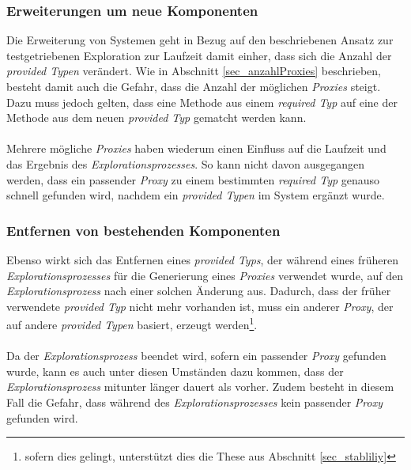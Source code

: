 \subsubsection{Erweiterungen um neue Komponenten}
Die Erweiterung von Systemen geht in Bezug auf den beschriebenen Ansatz zur testgetriebenen Exploration zur Laufzeit damit einher, dass sich die Anzahl der \emph{provided Typen} verändert. Wie in Abschnitt \ref{sec_anzahlProxies} beschrieben, besteht damit auch die Gefahr, dass die Anzahl der möglichen \emph{Proxies} steigt. Dazu muss jedoch gelten, dass eine Methode aus einem \emph{required Typ} auf eine der Methode aus dem neuen \emph{provided Typ} gematcht werden kann.
\\\\
Mehrere mögliche \emph{Proxies} haben wiederum einen Einfluss auf die Laufzeit und das Ergebnis des \emph{Explorationsprozesses}. So kann nicht davon ausgegangen werden, dass ein passender \emph{Proxy} zu einem bestimmten \emph{required Typ} genauso schnell gefunden wird, nachdem ein \emph{provided Typen} im System ergänzt wurde.
\subsubsection{Entfernen von bestehenden Komponenten}
Ebenso wirkt sich das Entfernen eines \emph{provided Typs}, der während eines früheren \emph{Explorationsprozesses} für die Generierung eines \emph{Proxies} verwendet wurde, auf den \emph{Explorationsprozess} nach einer solchen Änderung aus. Dadurch, dass der früher verwendete \emph{provided Typ} nicht mehr vorhanden ist, muss ein anderer \emph{Proxy}, der auf andere \emph{provided Typen} basiert, erzeugt werden\footnote{sofern dies gelingt, unterstützt dies die These aus Abschnitt \ref{sec_stabliliy}}.
\\\\
Da der \emph{Explorationsprozess} beendet wird, sofern ein passender \emph{Proxy} gefunden wurde, kann es auch unter diesen Umständen dazu kommen, dass der \emph{Explorationsprozess} mitunter länger dauert als vorher. Zudem besteht in diesem Fall die Gefahr, dass während des \emph{Explorationsprozesses} kein passender \emph{Proxy} gefunden wird.

